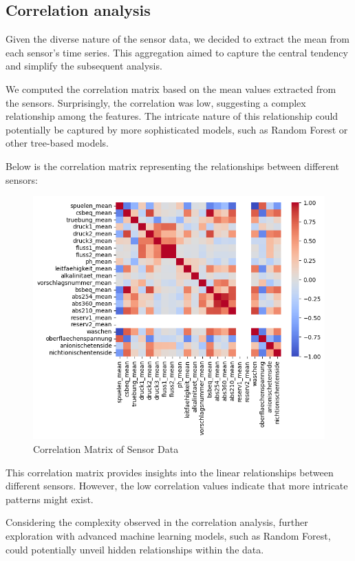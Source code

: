 \documentclass{report}
\begin{document}
\subsection{Correlation analysis}
Given the diverse nature of the sensor data, we decided to extract the mean from each sensor's time series. This aggregation aimed to capture the central tendency and simplify the subsequent analysis.

We computed the correlation matrix based on the mean values extracted from the sensors. Surprisingly, the correlation was low, suggesting a complex relationship among the features. The intricate nature of this relationship could potentially be captured by more sophisticated models, such as Random Forest or other tree-based models.

Below is the correlation matrix representing the relationships between different sensors:
\newpage
\begin{figure}
    \centering
    \includegraphics[width=1\textwidth]{correlation_matrix.png}
    \caption{Correlation Matrix of Sensor Data}
    \label{fig:correlation_matrix}
\end{figure}

This correlation matrix provides insights into the linear relationships between different sensors. However, the low correlation values indicate that more intricate patterns might exist.

Considering the complexity observed in the correlation analysis, further exploration with advanced machine learning models, such as Random Forest, could potentially unveil hidden relationships within the data.
\end{document}
